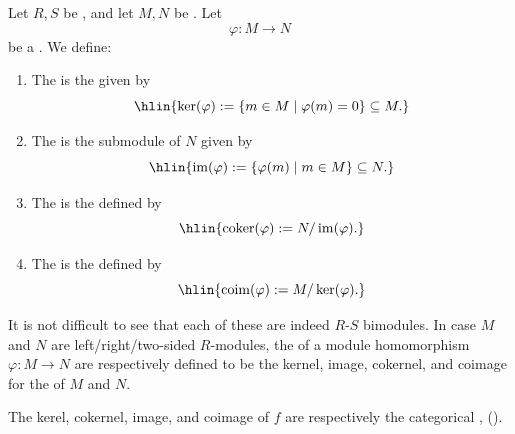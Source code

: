 \begin{definition} \label{definition:kernel_image_cokernel_coimage_of_a_module_homomorphism}
Let $R,S$ be , and let $M,N$ be . Let 
$$\varphi : M \to N$$ 
be a . We define:

\begin{enumerate}
    \item The  is the  given by
    $$\hlin{\ker(\varphi) := \{ m \in M \mid \varphi(m) = 0 \} \subseteq M.}$$

    \item The  is the submodule of $N$ given by
    $$\hlin{\operatorname{im}(\varphi) := \{ \varphi(m) \mid m \in M \} \subseteq N.}$$

    \item The  is the  defined by
    $$\hlin{\operatorname{coker}(\varphi) := N / \operatorname{im}(\varphi).}$$

    \item The  is the  defined by
    $$\hlin{\operatorname{coim}(\varphi) := M / \ker(\varphi).}$$
\end{enumerate}
It is not difficult to see that each of these are indeed $R$-$S$ bimodules. In case $M$ and $N$ are left/right/two-sided $R$-modules, the  of a module homomorphism $\varphi: M \to N$ are respectively defined to be the kernel, image, cokernel, and coimage for the  of $M$ and $N$.

The kerel, cokernel, image, and coimage of $f$ are respectively the categorical ,  ().

\end{definition}
